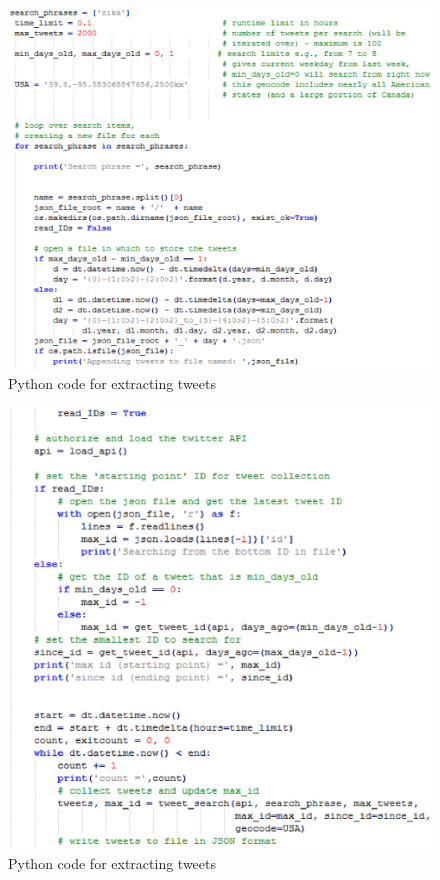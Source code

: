 \begin{figure}[h]
\centerline{\includegraphics[width=5.7in]{CODE-2}}
\caption{Python code for extracting tweets}
\end{figure}
\begin{figure}[h]
\centerline{\includegraphics[width=5.7in]{CODE-3}}
\caption{Python code for extracting tweets}
\end{figure}
